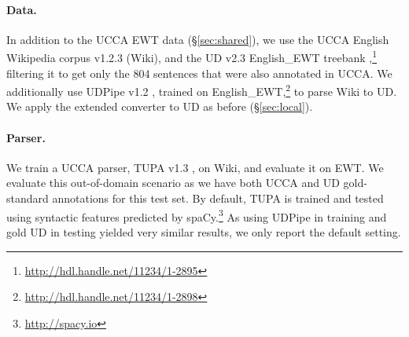 \documentclass[11pt,a4paper]{article}
\begin{document}
\paragraph{Data.}

In addition to the UCCA EWT data (\S\ref{sec:shared}),
we use the UCCA English Wikipedia corpus v1.2.3 (Wiki),
and the UD v2.3 English\_EWT treebank
\cite{11234/1-2895},\footnote{\url{http://hdl.handle.net/11234/1-2895}}
filtering it to get only the 804 sentences that were also annotated in UCCA.
We additionally use UDPipe v1.2 \cite{udpipe,udpipe:2017},
trained on
English\_EWT,\footnote{\url{http://hdl.handle.net/11234/1-2898}}
to parse Wiki to UD.
We apply the extended converter to UD as before (\S\ref{sec:local}).

\paragraph{Parser.}

We train a UCCA parser,
TUPA v1.3 \cite{hershcovich2017a,hershcovich2018multitask},
on Wiki, and evaluate it on EWT.
We evaluate this out-of-domain scenario as
we have both UCCA and UD gold-standard annotations for this test set.
By default, TUPA is trained and tested using syntactic features
predicted by spaCy.\footnote{\url{http://spacy.io}}
As using UDPipe in training and gold UD in testing yielded very similar
results, we only report the default setting.

%
\end{document}
